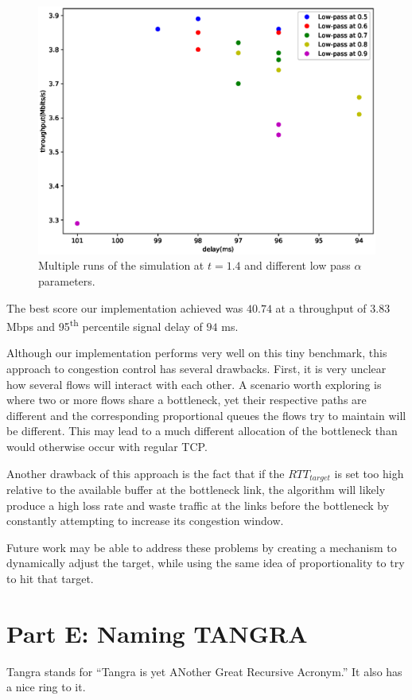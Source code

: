 \documentclass[12pt]{article}
\begin{document}
\begin{figure}[h]
\includegraphics[width=\textwidth,height=\textheight,keepaspectratio]{figure_2.eps}
\caption{Multiple runs of the simulation at $t=1.4$ and different low pass
$\alpha$ parameters.}
\label{fig:low-pass-1-4}
\end{figure}

The best score our implementation achieved was $40.74$ at a throughput of $3.83$
Mbps and 95\textsuperscript{th} percentile signal delay of $94$ ms.

Although our implementation performs very well on this tiny benchmark, this
approach to congestion control has several drawbacks. First, it is very unclear
how several flows will interact with each other. A scenario worth exploring is
where two or more flows share a bottleneck, yet their respective paths are
different and the corresponding proportional queues the flows try to maintain
will be different. This may lead to a much different allocation of the
bottleneck than would otherwise occur with regular TCP.

Another drawback of this approach is the fact that if the $RTT_{target}$ is set
too high relative to the available buffer at the bottleneck link, the algorithm
will likely produce a high loss rate and waste traffic at the links before the
bottleneck by constantly attempting to increase its congestion window.

Future work may be able to address these problems by creating a mechanism to
dynamically adjust the target, while using the same idea of proportionality to
try to hit that target.

\section*{Part E: Naming TANGRA}

Tangra stands for ``Tangra is yet ANother Great Recursive Acronym.'' It also has
a nice ring to it.

\pagebreak
\printbibliography
\end{document}
